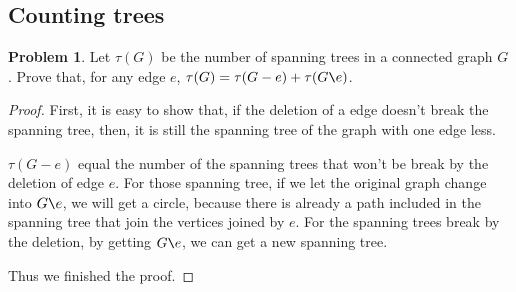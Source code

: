 \documentclass[a4paper,11pt]{article}%
\theoremstyle{remark}
\theoremstyle{definition}
\newtheorem{problem}{Problem}[subsection]
\begin{document}
\subsection{Counting trees}
\begin{problem}
    Let $\tau(G)$ be the number of spanning trees in a connected graph $G$.
Prove that, for any edge $e$, $\tau(G)=\tau(G-e)+\tau(G\verb|\|e)$.
\begin{proof}
   First, it is easy to show that, if the deletion of a 
   edge doesn't break the spanning tree, then, it is still the spanning tree 
   of the graph with one edge less. 

   $\tau(G-e)$ equal the number of the spanning trees that won't be break 
   by the deletion of edge $e$. For those spanning tree, if we 
   let the original graph change into $G\verb|\|e$, we will get a circle, because
   there is already a path included in the spanning tree that join the 
   vertices joined by $e$.
   For the spanning trees break by the deletion, by getting $G\verb|\|e$,
   we can get a new spanning tree.

   Thus we finished the proof.
    
\end{proof}
\end{problem}
\end{document}
